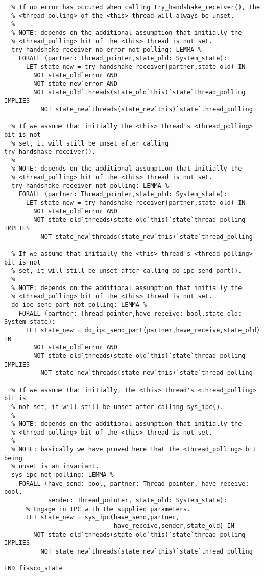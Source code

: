 \begin{lstlisting}
  % If no error has occured when calling try_handshake_receiver(), the
  % <thread_polling> of the <this> thread will always be unset.
  %
  % NOTE: depends on the additional assumption that initially the 
  % <thread_polling> bit of the <this> thread is not set.
  try_handshake_receiver_no_error_not_polling: LEMMA %-
    FORALL (partner: Thread_pointer,state_old: System_state):
      LET state_new = try_handshake_receiver(partner,state_old) IN
        NOT state_old`error AND 
        NOT state_new`error AND
        NOT state_old`threads(state_old`this)`state`thread_polling IMPLIES
          NOT state_new`threads(state_new`this)`state`thread_polling
  
  % If we assume that initially the <this> thread's <thread_polling> bit is not
  % set, it will still be unset after calling try_handshake_receiver().
  %
  % NOTE: depends on the additional assumption that initially the 
  % <thread_polling> bit of the <this> thread is not set.
  try_handshake_receiver_not_polling: LEMMA %-
    FORALL (partner: Thread_pointer,state_old: System_state):
      LET state_new = try_handshake_receiver(partner,state_old) IN
        NOT state_old`error AND        
        NOT state_old`threads(state_old`this)`state`thread_polling IMPLIES
          NOT state_new`threads(state_new`this)`state`thread_polling

  % If we assume that initially the <this> thread's <thread_polling> bit is not
  % set, it will still be unset after calling do_ipc_send_part().
  %
  % NOTE: depends on the additional assumption that initially the 
  % <thread_polling> bit of the <this> thread is not set.
  do_ipc_send_part_not_polling: LEMMA %-
    FORALL (partner: Thread_pointer,have_receive: bool,state_old: System_state):
      LET state_new = do_ipc_send_part(partner,have_receive,state_old) IN
        NOT state_old`error AND       
        NOT state_old`threads(state_old`this)`state`thread_polling IMPLIES
          NOT state_new`threads(state_new`this)`state`thread_polling

  % If we assume that initially, the <this> thread's <thread_polling> bit is
  % not set, it will still be unset after calling sys_ipc(). 
  %
  % NOTE: depends on the additional assumption that initially the 
  % <thread_polling> bit of the <this> thread is not set.
  %
  % NOTE: basically we have proved here that the <thread_polling> bit being
  % unset is an invariant.
  sys_ipc_not_polling: LEMMA %-
    FORALL (have_send: bool, partner: Thread_pointer, have_receive: bool,
            sender: Thread_pointer, state_old: System_state):
      % Engage in IPC with the supplied parameters.
      LET state_new = sys_ipc(have_send,partner,
                              have_receive,sender,state_old) IN        
        NOT state_old`threads(state_old`this)`state`thread_polling IMPLIES
          NOT state_new`threads(state_new`this)`state`thread_polling

END fiasco_state
\end{lstlisting}